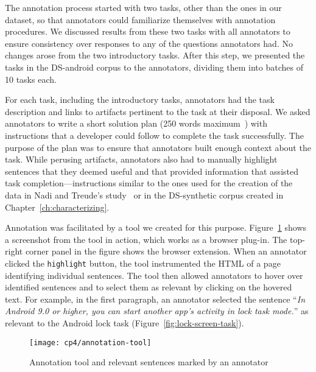 The annotation process started with two tasks, other than the ones in our dataset, so that annotators could familiarize themselves with annotation procedures.
We discussed results from these two tasks with all annotators to ensure consistency over responses to any of the questions annotators had. No changes arose from the two introductory tasks.
After this step, we presented the  tasks in the \acs{DS-android} corpus to the annotators, dividing them into batches of 10 tasks each. 



For each task, including the introductory tasks, annotators had the task description and links to artifacts pertinent to the task at their disposal. We asked annotators to write a short solution plan (250 words maximum~\cite{Rastkar2010}) with instructions that a developer could follow to complete the task successfully. 
The purpose of the plan was to ensure that annotators built enough context about the task.
While perusing artifacts, annotators also had to manually highlight sentences that they deemed useful and that provided information that assisted task completion---instructions similar to the ones used for the creation of the data in Nadi and Treude's study~\cite{nadi2020}
or in the \acs{DS-synthetic} corpus created in Chapter~\ref{ch:characterizing}.


Annotation was facilitated by a tool we created for this purpose. 
Figure~\ref{fig:corpus-annotation-tool} shows a screenshot from the tool in 
action, which works as a browser plug-in. The top-right corner panel in the figure shows the browser extension. When an annotator clicked the \texttt{highlight} button, 
the tool instrumented the HTML of a page identifying individual sentences. The tool then allowed annotators to hover over identified sentences and to select them as relevant by clicking on the hovered text. For example, in the first paragraph, an annotator selected  the sentence
``\textit{In Android 9.0 or higher, you can start another app's activity in lock task mode.}'' as relevant to the Android lock task (Figure~\ref{fig:lock-screen-task}).







\begin{figure}
    \centering
    \texttt{[image: cp4/annotation-tool]}
    \caption{Annotation tool and relevant sentences marked by an annotator}
    \label{fig:corpus-annotation-tool}
\end{figure}


